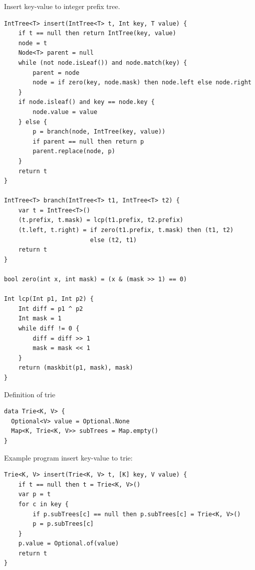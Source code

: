 \documentclass[b5paper]{article}
\begin{document}
Insert key-value to integer prefix tree.

\begin{lstlisting}[language = Bourbaki]
IntTree<T> insert(IntTree<T> t, Int key, T value) {
    if t == null then return IntTree(key, value)
    node = t
    Node<T> parent = null
    while (not node.isLeaf()) and node.match(key) {
        parent = node
        node = if zero(key, node.mask) then node.left else node.right
    }
    if node.isleaf() and key == node.key {
        node.value = value
    } else {
        p = branch(node, IntTree(key, value))
        if parent == null then return p
        parent.replace(node, p)
    }
    return t
}

IntTree<T> branch(IntTree<T> t1, IntTree<T> t2) {
    var t = IntTree<T>()
    (t.prefix, t.mask) = lcp(t1.prefix, t2.prefix)
    (t.left, t.right) = if zero(t1.prefix, t.mask) then (t1, t2)
                        else (t2, t1)
    return t
}

bool zero(int x, int mask) = (x & (mask >> 1) == 0)

Int lcp(Int p1, Int p2) {
    Int diff = p1 ^ p2
    Int mask = 1
    while diff != 0 {
        diff = diff >> 1
        mask = mask << 1
    }
    return (maskbit(p1, mask), mask)
}
\end{lstlisting}


Definition of trie

\begin{lstlisting}[language = Bourbaki]
data Trie<K, V> {
  Optional<V> value = Optional.None
  Map<K, Trie<K, V>> subTrees = Map.empty()
}
\end{lstlisting}

Example program insert key-value to trie:

\begin{lstlisting}[language = Bourbaki]
Trie<K, V> insert(Trie<K, V> t, [K] key, V value) {
    if t == null then t = Trie<K, V>()
    var p = t
    for c in key {
        if p.subTrees[c] == null then p.subTrees[c] = Trie<K, V>()
        p = p.subTrees[c]
    }
    p.value = Optional.of(value)
    return t
}
\end{lstlisting}
\end{document}

